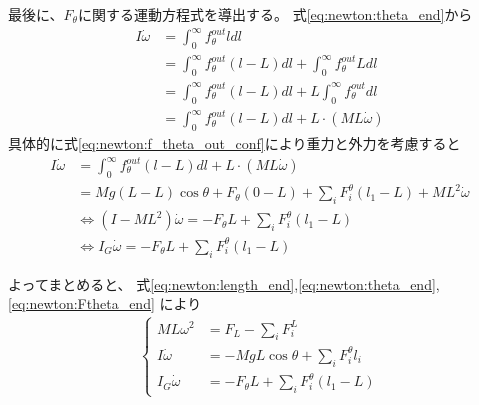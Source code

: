 \documentclass[a4paper,11pt]{jsarticle}
\begin{document}
最後に、$F_\theta$に関する運動方程式を導出する。
式\ref{eq:newton:theta_end}から
\begin{align}
  I\dot\omega 
  &= \int_0^\infty f_\theta^{out} l dl
  \\
  &= \int_0^\infty f_\theta^{out} ( l - L ) dl
  + \int_0^\infty f_\theta^{out} L dl
  \\
  &= \int_0^\infty f_\theta^{out} ( l - L ) dl
  + L \int_0^\infty f_\theta^{out} dl
  \\
  &= \int_0^\infty f_\theta^{out} ( l - L ) dl
  + L \cdot ( ML\dot\omega) 
\end{align}
具体的に式\ref{eq:newton:f_theta_out_conf}により重力と外力を考慮すると
\begin{align}
  I\dot\omega
  &= \int_0^\infty f_\theta^{out} ( l - L ) dl
  + L \cdot ( ML\dot\omega) 
  \\
  &= Mg(L - L) \cos\theta + F_\theta ( 0 - L ) + \sum_i F_i^\theta ( l_1 - L ) + ML^2\dot\omega
  \\
  & \Leftrightarrow
  ( I - ML^2 ) \dot\omega = - F_\theta L + \sum_i F_i^\theta ( l_1 - L )
  \\
  & \Leftrightarrow
  I_G \dot\omega = - F_\theta L + \sum_i F_i^\theta ( l_1 - L )
  \label{eq:newton:Ftheta_end}
\end{align}

よってまとめると、
式\ref{eq:newton:length_end},\ref{eq:newton:theta_end},\ref{eq:newton:Ftheta_end}
により
\begin{align}
  \begin{cases}
    ML\omega^2 &= F_L - \sum_i F_i^{L}
    \\
    I\dot\omega &= -MgL\cos\theta + \sum_i F_i^\theta l_i
    \\
    I_G \dot\omega &= - F_\theta L + \sum_i F_i^\theta ( l_1 - L )
  \end{cases}
\end{align}
\end{document}

